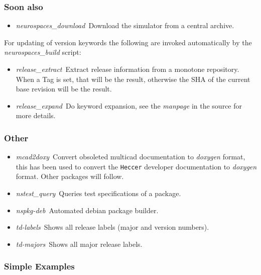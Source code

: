 \documentclass[12pt]{article}
\begin{document}
\subsubsection*{Soon also}

\begin{itemize}
	\item {\it neurospaces\_download}\,\,\,Download the simulator from a central archive.
\end{itemize}
For updating of version keywords the following are invoked automatically by the {\it neurospaces\_build} script:
\begin{itemize}
	\item {\it release\_extract}\,\,\,Extract release information from a monotone repository. When a Tag is set, that will be the result, otherwise the SHA of the current base revision will be the result.
	\item {\it release\_expand}\,\,\,Do keyword expansion, see the {\it manpage} in the source for more details. 
\end{itemize}

\subsubsection*{Other}

\begin{itemize}
\item {\it mcad2doxy}\,\,\,Convert obsoleted multicad documentation to
  {\it doxygen} format, this has been used to convert the {\tt Heccer}
  developer documentation to {\it doxygen} format. Other packages will
  follow.
\item {\it nstest\_query}\,\,\,Queries test specifications of a package.
\item {\it nspkg-deb}\,\,\,Automated debian package builder.
\item {\it td-labels}\,\,\,Shows all release labels (major and version numbers).
\item {\it td-majors}\,\,\,Shows all major release labels.
\end{itemize}

\subsubsection*{Simple Examples}
\end{document}

